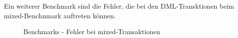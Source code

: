 \begin{flushleft}
    Ein weiterer Benchmark sind die Fehler, die bei den DML-Transktionen beim mixed-Benchnmark auftreten können.
    \begin{figure}[H]
        \centering
        \qquad
        \caption{Benchmarks - Fehler bei mixed-Transaktionen}
        \label{fig:pgbench_errors}
    \end{figure}
\end{flushleft}
\begin{flushleft}

\end{flushleft}
